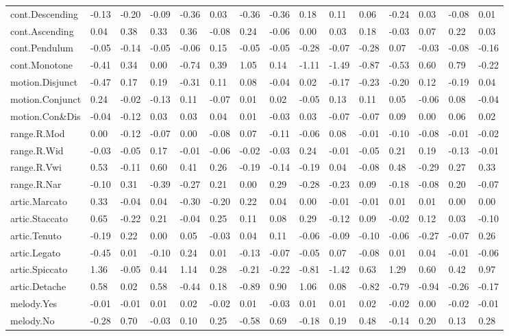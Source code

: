 \documentclass[
]{article}
\newenvironment{lltable}{\begin{landscape}\begin{center}\begin{ThreePartTable}}{\end{ThreePartTable}\end{center}\end{landscape}}
\begin{document}
\begin{lltable}
{\begin{longtable}{lllllllllllllll}
cont.Descending & -0.13 & -0.20 & -0.09 & -0.36 & 0.03 & -0.36 & -0.36 & 0.18 & 0.11 & 0.06 & -0.24 & 0.03 & -0.08 & 0.01\\
cont.Ascending & 0.04 & 0.38 & 0.33 & 0.36 & -0.08 & 0.24 & -0.06 & 0.00 & 0.03 & 0.18 & -0.03 & 0.07 & 0.22 & 0.03\\
cont.Pendulum & -0.05 & -0.14 & -0.05 & -0.06 & 0.15 & -0.05 & -0.05 & -0.28 & -0.07 & -0.28 & 0.07 & -0.03 & -0.08 & -0.16\\
cont.Monotone & -0.41 & 0.34 & 0.00 & -0.74 & 0.39 & 1.05 & 0.14 & -1.11 & -1.49 & -0.87 & -0.53 & 0.60 & 0.79 & -0.22\\
motion.Disjunct & -0.47 & 0.17 & 0.19 & -0.31 & 0.11 & 0.08 & -0.04 & 0.02 & -0.17 & -0.23 & -0.20 & 0.12 & -0.19 & 0.04\\
motion.Conjunct & 0.24 & -0.02 & -0.13 & 0.11 & -0.07 & 0.01 & 0.02 & -0.05 & 0.13 & 0.11 & 0.05 & -0.06 & 0.08 & -0.04\\
motion.Con\&Dis & -0.04 & -0.12 & 0.03 & 0.03 & 0.04 & 0.01 & -0.03 & 0.03 & -0.07 & -0.07 & 0.09 & 0.00 & 0.06 & 0.02\\
range.R.Mod & 0.00 & -0.12 & -0.07 & 0.00 & -0.08 & 0.07 & -0.11 & -0.06 & 0.08 & -0.01 & -0.10 & -0.08 & -0.01 & -0.02\\
range.R.Wid & -0.03 & -0.05 & 0.17 & -0.01 & -0.06 & -0.02 & -0.03 & 0.24 & -0.01 & -0.05 & 0.21 & 0.19 & -0.13 & -0.01\\
range.R.Vwi & 0.53 & -0.11 & 0.60 & 0.41 & 0.26 & -0.19 & -0.14 & -0.19 & 0.04 & -0.08 & 0.48 & -0.29 & 0.27 & 0.33\\
range.R.Nar & -0.10 & 0.31 & -0.39 & -0.27 & 0.21 & 0.00 & 0.29 & -0.28 & -0.23 & 0.09 & -0.18 & -0.08 & 0.20 & -0.07\\
artic.Marcato & 0.33 & -0.04 & 0.04 & -0.30 & -0.20 & 0.22 & 0.04 & 0.00 & -0.01 & -0.01 & 0.01 & 0.01 & 0.00 & 0.00\\
artic.Staccato & 0.65 & -0.22 & 0.21 & -0.04 & 0.25 & 0.11 & 0.08 & 0.29 & -0.12 & 0.09 & -0.02 & 0.12 & 0.03 & -0.10\\
artic.Tenuto & -0.19 & 0.22 & 0.00 & 0.05 & -0.03 & 0.04 & 0.11 & -0.06 & -0.09 & -0.10 & -0.06 & -0.27 & -0.07 & 0.26\\
artic.Legato & -0.45 & 0.01 & -0.10 & 0.24 & 0.01 & -0.13 & -0.07 & -0.05 & 0.07 & -0.08 & 0.01 & 0.04 & -0.01 & -0.06\\
artic.Spiccato & 1.36 & -0.05 & 0.44 & 1.14 & 0.28 & -0.21 & -0.22 & -0.81 & -1.42 & 0.63 & 1.29 & 0.60 & 0.42 & 0.97\\
artic.Detache & 0.58 & 0.02 & 0.58 & -0.44 & 0.18 & -0.89 & 0.90 & 1.06 & 0.08 & -0.82 & -0.79 & -0.94 & -0.26 & -0.17\\
melody.Yes & -0.01 & -0.01 & 0.01 & 0.02 & -0.02 & 0.01 & -0.03 & 0.01 & 0.01 & 0.02 & -0.02 & 0.00 & -0.02 & -0.01\\
melody.No & -0.28 & 0.70 & -0.03 & 0.10 & 0.25 & -0.58 & 0.69 & -0.18 & 0.19 & 0.48 & -0.14 & 0.20 & 0.13 & 0.28\\
\bottomrule
\end{longtable}

}

\end{lltable}
\end{document}
